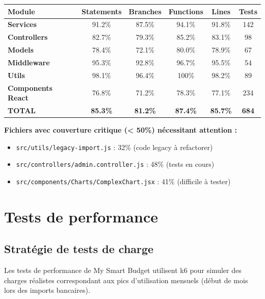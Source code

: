 \begin{tcolorbox}[colback=green!5!white,colframe=green!60!black,title=\textbf{Couverture de code actuelle (Décembre 2024)}]
\begin{center}
\begin{tabular}{|l|c|c|c|c|c|}
\hline
\textbf{Module} & \textbf{Statements} & \textbf{Branches} & \textbf{Functions} & \textbf{Lines} & \textbf{Tests} \\
\hline
\textbf{Services} & 91.2\% & 87.5\% & 94.1\% & 91.8\% & 142 \\
\hline
\textbf{Controllers} & 82.7\% & 79.3\% & 85.2\% & 83.1\% & 98 \\
\hline
\textbf{Models} & 78.4\% & 72.1\% & 80.0\% & 78.9\% & 67 \\
\hline
\textbf{Middleware} & 95.3\% & 92.8\% & 96.7\% & 95.5\% & 54 \\
\hline
\textbf{Utils} & 98.1\% & 96.4\% & 100\% & 98.2\% & 89 \\
\hline
\textbf{Components React} & 76.8\% & 71.2\% & 78.3\% & 77.1\% & 234 \\
\hline
\hline
\textbf{TOTAL} & \textbf{85.3\%} & \textbf{81.2\%} & \textbf{87.4\%} & \textbf{85.7\%} & \textbf{684} \\
\hline
\end{tabular}
\end{center}

\textbf{Fichiers avec couverture critique (< 50\%) nécessitant attention :}
\begin{itemize}
    \item \texttt{src/utils/legacy-import.js} : 32\% (code legacy à refactorer)
    \item \texttt{src/controllers/admin.controller.js} : 48\% (tests en cours)
    \item \texttt{src/components/Charts/ComplexChart.jsx} : 41\% (difficile à tester)
\end{itemize}
\end{tcolorbox}

\section{Tests de performance}

\subsection{Stratégie de tests de charge}

Les tests de performance de My Smart Budget utilisent k6 pour simuler des charges réalistes correspondant aux pics d'utilisation mensuels (début de mois lors des imports bancaires).

